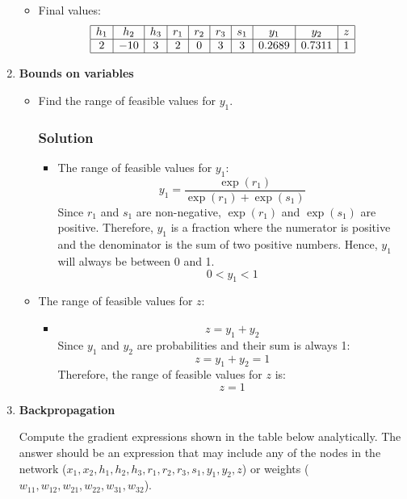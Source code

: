 \documentclass{article}
\begin{document}
\begin{enumerate}[label=\alph*)]
\begin{itemize}
         \item Final values:
         \[
         \begin{array}{|c|c|c|c|c|c|c|c|c|c|}
         \hline
         h_1 & h_2 & h_3 & r_1 & r_2 & r_3 & s_1 & y_1 & y_2 & z \\
         \hline
         2 & -10 & 3 & 2 & 0 & 3 & 3 & 0.2689 & 0.7311 & 1 \\
         \hline
         \end{array}
         \]
      \end{itemize}
   \item \textbf{Bounds on variables}

   \begin{itemize}
   \item Find the range of feasible values for \(y_1\).
   \subsubsection*{Solution}
   \begin{itemize}
      \item The range of feasible values for \(y_1\):
      \[
      y_1 = \frac{\exp(r_1)}{\exp(r_1) + \exp(s_1)}
      \]
      Since \(r_1\) and \(s_1\) are non-negative, \(\exp(r_1)\) and \(\exp(s_1)\) are positive. Therefore, 
      \(y_1\) is a fraction where the numerator is positive and the denominator is the sum of two positive numbers.
       Hence, \(y_1\) will always be between 0 and 1.
      \[
      0 < y_1 < 1
      \]
   \end{itemize}

      \item The range of feasible values for \(z\):
   \begin{itemize}
      \item 
      \[
      z = y_1 + y_2
      \]
      Since \(y_1\) and \(y_2\) are probabilities and their sum is always 1:
      \[
      z = y_1 + y_2 = 1
      \]
      Therefore, the range of feasible values for \(z\) is:
      \[
      z = 1
      \]
   \end{itemize}
   \end{itemize}

   \item \textbf{Backpropagation}

   Compute the gradient expressions shown in the table below analytically. The answer should be an expression that
    may include any of the nodes in the network (\(x_1, x_2, h_1, h_2, h_3, r_1, r_2, r_3, s_1, y_1, y_2, z\)) 
    or weights (\(w_{11}, w_{12}, w_{21}, w_{22}, w_{31}, w_{32}\)).
   

\end{enumerate}
\end{document}
